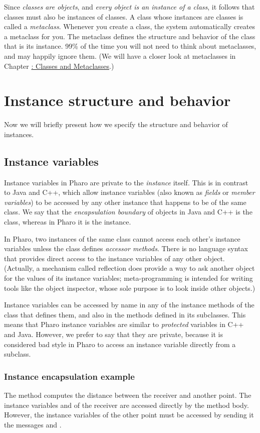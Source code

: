 \documentclass[10pt,twoside,english]{_support/latex/sbabook/sbabook}
\begin{document}
Since \textit{classes are objects}, and \textit{every object is an instance of a class},
it follows that classes must also be instances of classes. A class whose
instances are classes is called a \textit{metaclass}. Whenever you create a class,
the system automatically creates a metaclass for you. The metaclass defines the
structure and behavior of the class that is its instance. 99\% of the time you
will not need to think about metaclasses, and may happily ignore them. (We will
have a closer look at metaclasses in Chapter
\hyperref[cha:metaclasses]{: Classes and Metaclasses}.)
\chapter{Instance structure and behavior}
Now we will briefly present how we specify the structure and behavior of
instances.
\section{Instance variables}
Instance variables in Pharo are private to the \textit{instance} itself. This is in
contrast to Java and C++, which allow instance variables (also known as
\textit{fields} or \textit{member variables}) to be accessed by any other instance that
happens to be of the same class. We say that the \textit{encapsulation boundary} of
objects in Java and C++ is the class, whereas in Pharo it is the instance.

In Pharo, two instances of the same class cannot access each other's instance
variables unless the class defines \textit{accessor methods}. There is no language
syntax that provides direct access to the instance variables of any other
object. (Actually, a mechanism called reflection does provide a way to ask
another object for the values of its instance variables; meta-programming is
intended for writing tools like the object inspector, whose sole purpose is to
look inside other objects.)

Instance variables can be accessed by name in any of the instance methods of the
class that defines them, and also in the methods defined in its subclasses. This
means that Pharo instance variables are similar to \textit{protected} variables in
C++ and Java. However, we prefer to say that they are private, because it is
considered bad style in Pharo to access an instance variable directly from a
subclass.
\subsection{Instance encapsulation example}
The method  computes the distance between the receiver and
another point. The instance variables  and  of the receiver are
accessed directly by the method body. However, the instance variables of the
other point must be accessed by sending it the messages  and .
\end{document}
